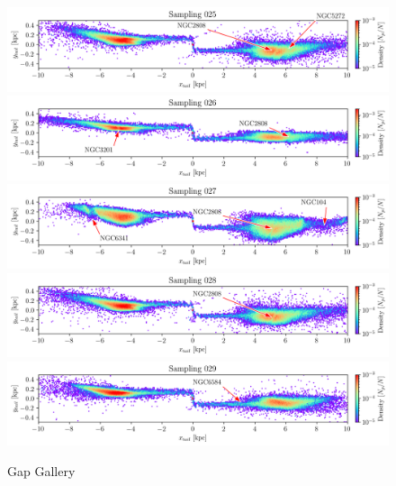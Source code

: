 \documentclass[draft]{aa}
\begin{document}
\begin{appendix}
    \begin{figure}
      \centering
      \includegraphics[width=\linewidth]{gallery_of_gaps_monte-carlo-025.png}
      \includegraphics[width=\linewidth]{gallery_of_gaps_monte-carlo-026.png}
      \includegraphics[width=\linewidth]{gallery_of_gaps_monte-carlo-027.png}
      \includegraphics[width=\linewidth]{gallery_of_gaps_monte-carlo-028.png}
      \includegraphics[width=\linewidth]{gallery_of_gaps_monte-carlo-029.png}
      \caption{Gap Gallery}
      \label{fig:TailCoordinates}
    \end{figure}        


\end{appendix}
\end{document}
